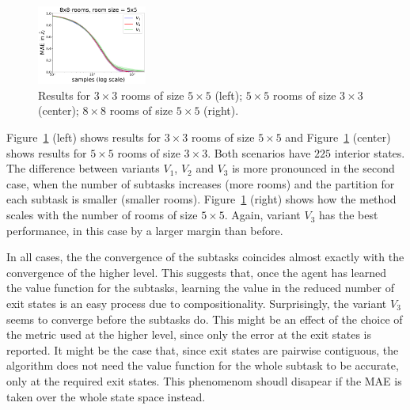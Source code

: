 \begin{figure}[!htb]
\includegraphics[width=0.32\textwidth]{figures/chapter1/subtasks/nrooms_8_8_subtasks.png}
\caption{ Results for $3\times 3$ rooms of size $5 \times 5$ (left);
$5\times 5$ rooms of size $3 \times 3$ (center); $8 \times 8$ rooms of size $5\times 5$ (right).}
\label{fig:hlmdps_errors_nrooms}
\end{figure}

Figure~\ref{fig:hlmdps_errors_nrooms} (left) shows results for $3\times 3$ rooms of size $5\times 5$ and Figure~\ref{fig:hlmdps_errors_nrooms} (center) shows results for $5\times 5$ rooms of size $3\times 3$. Both scenarios have $225$ interior states.
The difference between variants $V_1$, $V_2$ and $V_3$ is more pronounced in the second case, when the number of subtasks increases (more rooms) and the partition for each subtask is smaller (smaller rooms). Figure~\ref{fig:hlmdps_errors_nrooms} (right) shows how the method scales with the number of rooms of size $5\times 5$.
Again, variant $V_3$ has the best performance, in this case by a larger 
margin than before.

In all cases, the the convergence of the subtasks coincides almost exactly with the convergence of the higher level. This suggests that, once the agent has learned the value function for the subtasks, learning the value in the reduced number of exit states is an easy process due to compositionality. Surprisingly, the variant $V_3$ seems to converge before the subtasks do. This might be an effect of the choice of the metric used at the higher level, since only the error at the exit states is reported. It might be the case that, since exit states are pairwise contiguous, the algorithm does not need the value function for the whole subtask to be accurate, only at the required exit states. This phenomenom shoudl disapear if the MAE is taken over the whole state space instead.




